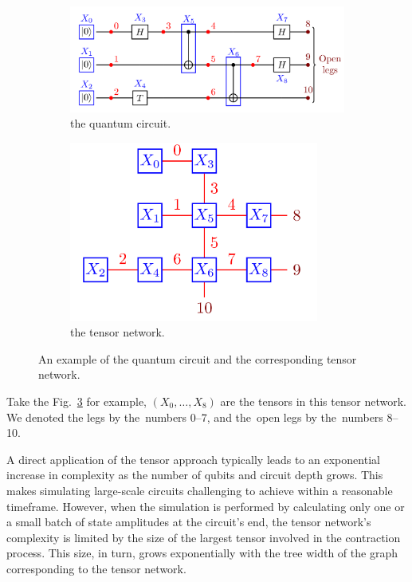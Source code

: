 \begin{figure}
    \centering
    \begin{subfigure}{0.5\textwidth}
        \centering
        \includegraphics[width=\textwidth]{images/6_3_circ.png}
        \caption{the quantum circuit.}
        \label{6_3_circ}
    \end{subfigure}
    \begin{subfigure}{0.4\textwidth}
        \centering
        \includegraphics[width=0.9\textwidth]{images/6_3_tn.png}
        \caption{the tensor network.}
        \label{6_3_tn}
    \end{subfigure}
    \caption{An example of the quantum circuit and the corresponding tensor network.}
    \label{fig:6_3_tn_circ}
\end{figure}

Take the Fig.~\ref{fig:6_3_tn_circ} for example, $(X_{0}, \ldots, X_{8})$ are the tensors in this tensor network. We denoted the legs by the~numbers 0--7, and the~open legs by the~numbers 8--10.

A direct application of the tensor approach typically leads to an exponential increase in complexity as the number of qubits and circuit depth grows. This makes simulating large-scale circuits challenging to achieve within a reasonable timeframe. However, when the simulation is performed by calculating only one or a small batch of state amplitudes at the circuit's end, the tensor network's complexity is limited by the size of the largest tensor involved in the contraction process. This size, in turn, grows exponentially with the tree width of the graph corresponding to the tensor network\cite{Markov_2008}.

